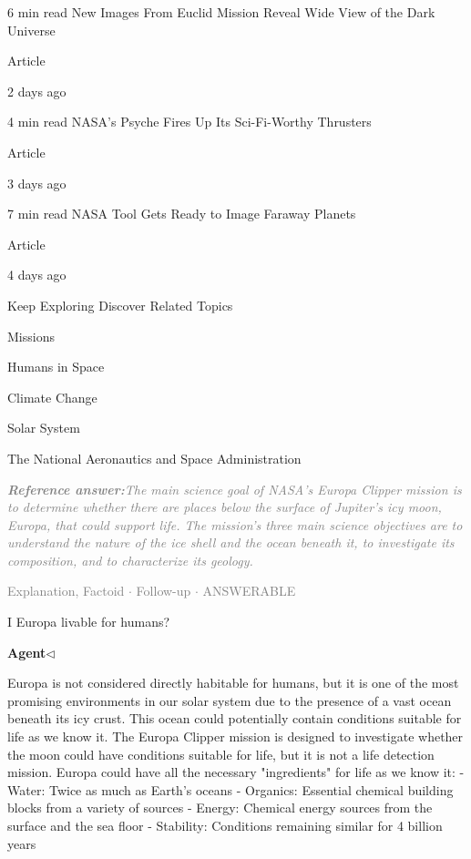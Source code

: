 \documentclass[a4paper,11pt]{article}
\begin{document}
\begin{docenv}
{6 min read
New Images From Euclid Mission Reveal Wide View of the Dark Universe

Article

	2 days ago	

 

4 min read
NASA’s Psyche Fires Up Its Sci-Fi-Worthy Thrusters

Article

	3 days ago	

 

7 min read
NASA Tool Gets Ready to Image Faraway Planets

Article

	4 days ago	

 

Keep Exploring
Discover Related Topics

Missions

 

Humans in Space

 

Climate Change

 

Solar System

 

The National Aeronautics and Space Administration}
\end{docenv}
\begin{refanswerenv}
{\footnotesize\textit{\textcolor{gray}{\textbf{Reference answer:}\enspace The main science goal of NASA's Europa Clipper mission is to determine whether there are places below the surface of Jupiter's icy moon, Europa, that could support life. The mission's three main science objectives are to understand the nature of the ice shell and the ocean beneath it, to investigate its composition, and to characterize its geology.}}}
\end{refanswerenv}
\vspace{0.5em}
\hfill{\tiny\textcolor{gray}{Explanation, Factoid $\cdot$ Follow-up $\cdot$ ANSWERABLE}}
\begin{userbubble}
I Europa livable for humans?
\end{userbubble}
\noindent\hfill{\small\textcolor{agentcolor}{\textbf{Agent\enspace$\triangleleft$}}}
\begin{agentbubble}
Europa is not considered directly habitable for humans, but it is one of the most promising environments in our solar system due to the presence of a vast ocean beneath its icy crust. This ocean could potentially contain conditions suitable for life as we know it. The Europa Clipper mission is designed to investigate whether the moon could have conditions suitable for life, but it is not a life detection mission. Europa could have all the necessary "ingredients" for life as we know it: 
- Water: Twice as much as Earth’s oceans
- Organics: Essential chemical building blocks from a variety of sources
- Energy: Chemical energy sources from the surface and the sea floor
- Stability: Conditions remaining similar for 4 billion years
\end{agentbubble}
\end{document}
